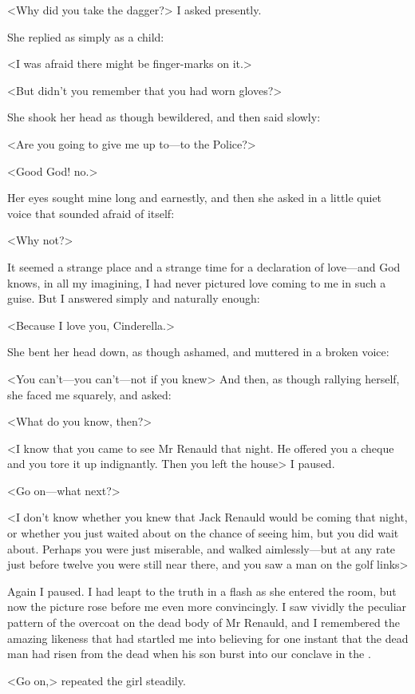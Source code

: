  <Why did you take the dagger?> I asked presently. 

 She replied as simply as a child: 

 <I was afraid there might be finger-marks on it.> 

 <But didn't you remember that you had worn gloves?> 

 She shook her head as though bewildered, and then said slowly: 

 <Are you going to give me up to—to the Police?> 

 <Good God! no.> 

 Her eyes sought mine long and earnestly, and then she asked in a little quiet voice that sounded afraid of itself: 

 <Why not?> 

 It seemed a strange place and a strange time for a declaration of love—and God knows, in all my imagining, I had never pictured love coming to me in such a guise. But I answered simply and naturally enough: 

 <Because I love you, Cinderella.> 

 She bent her head down, as though ashamed, and muttered in a broken voice: 

 <You can't—you can't—not if you knew\longdash> And then, as though rallying herself, she faced me squarely, and asked: 

 <What do you know, then?> 

 <I know that you came to see Mr Renauld that night. He offered you a cheque and you tore it up indignantly. Then you left the house\longdash> I paused. 

 <Go on—what next?> 

 <I don't know whether you knew that Jack Renauld would be coming that night, or whether you just waited about on the chance of seeing him, but you did wait about. Perhaps you were just miserable, and walked aimlessly—but at any rate just before twelve you were still near there, and you saw a man on the golf links\longdash> 

 Again I paused. I had leapt to the truth in a flash as she entered the room, but now the picture rose before me even more convincingly. I saw vividly the peculiar pattern of the overcoat on the dead body of Mr Renauld, and I remembered the amazing likeness that had startled me into believing for one instant that the dead man had risen from the dead when his son burst into our conclave in the . 

 <Go on,> repeated the girl steadily. 

